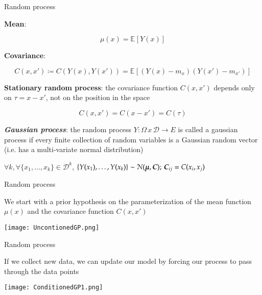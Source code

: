 \documentclass[9pt]{beamer}
\newcommand{\Expectation}[2]{\mathbb{E}_{#1}\left[ #2 \right]}
\begin{document}
\begin{frame}[t]{Random process}

\textbf{Mean}:

\[
\mu (x) = \Expectation{}{Y(x)}
\]

\textbf{Covariance}:

\[
C(x,x') \coloneqq C( Y(x), Y(x') ) = \Expectation{}{ ( Y(x) - m_x ) ( Y(x') - m_{x'} ) }
\]

\textbf{Stationary random process}: the covariance function $C(x,x')$ depends only on $\tau = x - x'$, not on the position in the space

\[
C(x, x') = C(x-x') = C(\tau)
\]

\textit{\textbf{Gaussian process}}: the random process $Y: \Omega \, x \, \mathcal{D} \to E$ is called a gaussian process if every finite collection of random variables is a Gaussian random vector (i.e. has a multi-variate normal distribution)

\begin{center}
$\forall k, \forall \{x_1, \dots , x_k \} \in \mathcal{D}^k$, $\{ Y(x_1), \dots , Y(x_k) \} \sim \mathcal{N}( \boldsymbol \mu, \boldsymbol C ); \, \boldsymbol C_{ij} = C(x_i, x_j)$ 
\end{center}


\end{frame}


\begin{frame}[t]{Random process}

We start with a prior hypothesis on the parameterization of the mean function $\mu(x)$ and the covariance function $C(x,x')$

\begin{center}
\texttt{[image: UncontionedGP.png]}
\end{center}

\end{frame}

\begin{frame}[t]{Random process}

If we collect new data, we can update our model by forcing our process to pass through the data points

\begin{center}
\texttt{[image: ConditionedGP1.png]}
\end{center}

\end{frame}
\end{document}
